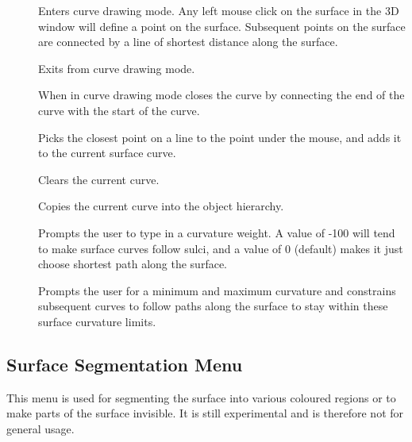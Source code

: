 \begin{description}
\item[]  Enters curve drawing
    mode.  Any left mouse click on the surface in the 3D window will
    define a point on the surface.  Subsequent points on the surface are
    connected by a line of shortest distance along the surface.
\item[]  Exits from curve
    drawing mode.
\item[]  When in curve drawing mode
    closes the curve by connecting the end of the curve with the
    start of the curve.
\item[]  Picks the closest point
    on a line to the point under the mouse, and adds it to the current
    surface curve.
\item[]  Clears the current curve.
\item[]  Copies the current curve
    into the object hierarchy.
\item[]  Prompts the user to type
    in a curvature weight.  A value of -100 will tend to make surface
    curves follow sulci, and a value of 0 (default) makes it just choose
    shortest path along the surface.
\item[]  Prompts the user
    for a minimum and maximum curvature and constrains subsequent curves
    to follow paths along the surface to stay within these surface
    curvature limits.
\end{description}

\subsection{Surface Segmentation Menu}

This menu is used for segmenting the surface into various coloured regions
or to make parts of the surface invisible.  It is still experimental and
is therefore not for general usage.


